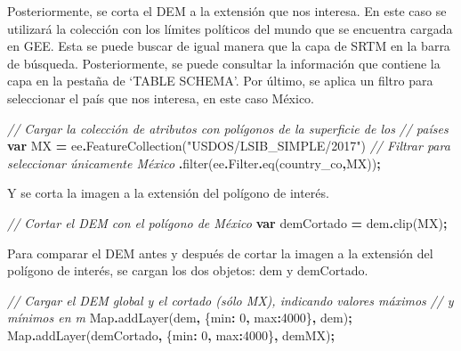 \documentclass[
  12pt,
  letterpaper,
  twoside]{book}
\newenvironment{Shaded}{\begin{snugshade}}{\end{snugshade}}
\newcommand{\AttributeTok}[1]{\textcolor[rgb]{0.77,0.63,0.00}{#1}}
\newcommand{\BuiltInTok}[1]{#1}
\newcommand{\CommentTok}[1]{\textcolor[rgb]{0.56,0.35,0.01}{\textit{#1}}}
\newcommand{\DataTypeTok}[1]{\textcolor[rgb]{0.13,0.29,0.53}{#1}}
\newcommand{\DecValTok}[1]{\textcolor[rgb]{0.00,0.00,0.81}{#1}}
\newcommand{\FunctionTok}[1]{\textcolor[rgb]{0.00,0.00,0.00}{#1}}
\newcommand{\KeywordTok}[1]{\textcolor[rgb]{0.13,0.29,0.53}{\textbf{#1}}}
\newcommand{\NormalTok}[1]{#1}
\newcommand{\OperatorTok}[1]{\textcolor[rgb]{0.81,0.36,0.00}{\textbf{#1}}}
\newcommand{\StringTok}[1]{\textcolor[rgb]{0.31,0.60,0.02}{#1}}
\begin{document}
Posteriormente, se corta el DEM a la extensión que nos interesa. En este caso se utilizará la colección con los límites políticos del mundo que se encuentra cargada en GEE. Esta se puede buscar de igual manera que la capa de SRTM en la barra de búsqueda. Posteriormente, se puede consultar la información que contiene la capa en la pestaña de `TABLE SCHEMA'. Por último, se aplica un filtro para seleccionar el país que nos interesa, en este caso México.

\begin{Shaded}
\begin{Highlighting}[]
\CommentTok{// Cargar la colección de atributos con polígonos de la superficie de los }
\CommentTok{// países}
\KeywordTok{var}\NormalTok{ MX }\OperatorTok{=}\NormalTok{ ee}\OperatorTok{.}\FunctionTok{FeatureCollection}\NormalTok{(}\StringTok{"USDOS/LSIB\_SIMPLE/2017"}\NormalTok{)}
   \CommentTok{// Filtrar para seleccionar únicamente México}
  \OperatorTok{.}\FunctionTok{filter}\NormalTok{(ee}\OperatorTok{.}\AttributeTok{Filter}\OperatorTok{.}\FunctionTok{eq}\NormalTok{(}\StringTok{\textquotesingle{}country\_co\textquotesingle{}}\OperatorTok{,}\StringTok{\textquotesingle{}MX\textquotesingle{}}\NormalTok{))}\OperatorTok{;}
\end{Highlighting}
\end{Shaded}

Y se corta la imagen a la extensión del polígono de interés.

\begin{Shaded}
\begin{Highlighting}[]
\CommentTok{// Cortar el DEM con el polígono de México}
\KeywordTok{var}\NormalTok{ demCortado }\OperatorTok{=}\NormalTok{ dem}\OperatorTok{.}\FunctionTok{clip}\NormalTok{(MX)}\OperatorTok{;}
\end{Highlighting}
\end{Shaded}

Para comparar el DEM antes y después de cortar la imagen a la extensión del polígono de interés, se cargan los dos objetos: dem y demCortado.

\begin{Shaded}
\begin{Highlighting}[]
\CommentTok{// Cargar el DEM global y el cortado (sólo MX), indicando valores máximos }
\CommentTok{// y mínimos en m}
\BuiltInTok{Map}\OperatorTok{.}\FunctionTok{addLayer}\NormalTok{(dem}\OperatorTok{,}\NormalTok{ \{}\DataTypeTok{min}\OperatorTok{:} \DecValTok{0}\OperatorTok{,} \DataTypeTok{max}\OperatorTok{:}\DecValTok{4000}\NormalTok{\}}\OperatorTok{,} \StringTok{\textquotesingle{}dem\textquotesingle{}}\NormalTok{)}\OperatorTok{;}
\BuiltInTok{Map}\OperatorTok{.}\FunctionTok{addLayer}\NormalTok{(demCortado}\OperatorTok{,}\NormalTok{ \{}\DataTypeTok{min}\OperatorTok{:} \DecValTok{0}\OperatorTok{,} \DataTypeTok{max}\OperatorTok{:}\DecValTok{4000}\NormalTok{\}}\OperatorTok{,} \StringTok{\textquotesingle{}demMX\textquotesingle{}}\NormalTok{)}\OperatorTok{;}
\end{Highlighting}
\end{Shaded}
\end{document}
